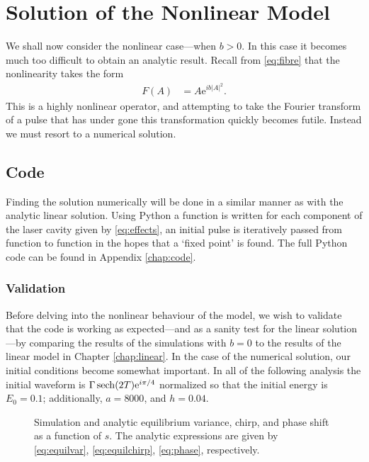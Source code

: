 
\chapter{Solution of the Nonlinear Model}
\label{chap:nl}
We shall now consider the nonlinear case---when $b > 0$. In this case it becomes much too difficult to obtain an analytic result. Recall from \eqref{eq:fibre} that the nonlinearity takes the form
\begin{align*}
F(A) &= A \textrm{e}^{i b |A|^2}.
\end{align*}
This is a highly nonlinear operator, and attempting to take the Fourier transform of a pulse that has under gone this transformation quickly becomes futile. Instead we must resort to a numerical solution. \\

\section{Code}
Finding the solution numerically will be done in a similar manner as with the analytic linear solution. Using Python a function is written for each component of the laser cavity given by \eqref{eq:effects}, an initial pulse is iteratively passed from function to function in the hopes that a `fixed point' is found. The full Python code can be found in Appendix \ref{chap:code}. \\

\subsection{Validation}
Before delving into the nonlinear behaviour of the model, we wish to validate that the code is working as expected---and as a sanity test for the linear solution---by comparing the results of the simulations with $b=0$ to the results of the linear model in Chapter \ref{chap:linear}. In the case of the numerical solution, our initial conditions become somewhat important. In all of the following analysis the initial waveform is $\Gamma \sech \left( 2T \right) \textrm{e}^{i \pi / 4}$ normalized so that the initial energy is $E_0 = 0.1$; additionally, $a = 8000$, and $h = 0.04$. \\
\begin{figure}[tbp]
\centering

\caption[Equilibrium variance, chirp, and phase shift of the pulse as a function of $s$.]{Simulation and analytic equilibrium variance, chirp, and phase shift as a function of $s$. The analytic expressions are given by \eqref{eq:equilvar}, \eqref{eq:equilchirp}, \eqref{eq:phase}, respectively.}
\label{fig:var}
\end{figure}

